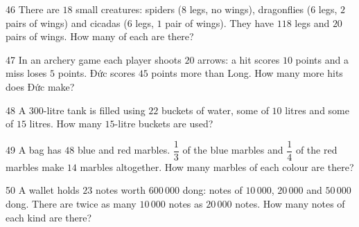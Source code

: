 \gap
\begin{probbox}{46}{}
There are $18$ small creatures: spiders ($8$ legs, no wings), dragonflies ($6$ legs, $2$ pairs of wings) and cicadas ($6$ legs, $1$ pair of wings). They have $118$ legs and $20$ pairs of wings. How many of each are there?
\end{probbox}
\gap
\begin{probbox}{47}{}
In an archery game each player shoots $20$ arrows: a hit scores $10$ points and a miss loses $5$ points. Đức scores $45$ points more than Long. How many more hits does Đức make?
\end{probbox}
\gap
\begin{probbox}{48}{}
A $300$-litre tank is filled using $22$ buckets of water, some of $10$ litres and some of $15$ litres. How many $15$-litre buckets are used?
\end{probbox}
\gap
\begin{probbox}{49}{}
A bag has $48$ blue and red marbles. $\dfrac13$ of the blue marbles and $\dfrac14$ of the red marbles make $14$ marbles altogether. How many marbles of each colour are there?
\end{probbox}
\gap
\begin{probbox}{50}{}
A wallet holds $23$ notes worth $600\,000$ dong: notes of $10\,000$, $20\,000$ and $50\,000$ dong. There are twice as many $10\,000$ notes as $20\,000$ notes. How many notes of each kind are there?
\end{probbox}
